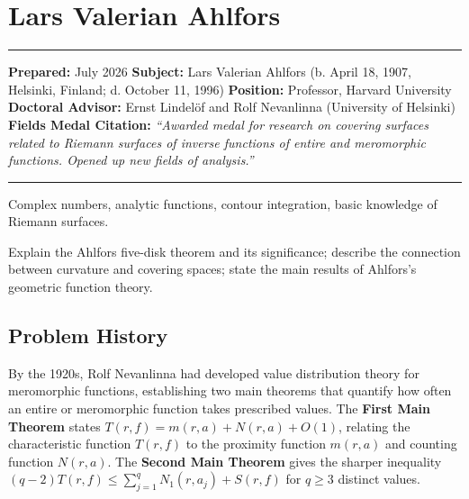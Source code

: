 \chapter{Lars Valerian Ahlfors}\label{ch1936larsvalerianahlfors:lars-valerian-ahlfors-fields-medal-1936-a-comprehensive-report}

\begin{center}\rule{0.5\linewidth}{0.5pt}\end{center}

\textbf{Prepared:} July 2026 \textbf{Subject:} Lars Valerian Ahlfors (b.
April 18, 1907, Helsinki, Finland; d. October 11, 1996) \textbf{Position:} Professor, Harvard
University \textbf{Doctoral Advisor:} Ernst Lindel\"{o}f and Rolf Nevanlinna
(University of Helsinki) \textbf{Fields Medal Citation:} \emph{``Awarded
medal for research on covering surfaces related to Riemann surfaces of
inverse functions of entire and meromorphic functions. Opened up new
fields of analysis.''}

\begin{center}\rule{0.5\linewidth}{0.5pt}\end{center}

\begin{prereqs} Complex numbers, analytic functions, contour integration, basic knowledge of Riemann surfaces. \end{prereqs}

\begin{objectives} Explain the Ahlfors five-disk theorem and its significance; describe the connection between curvature and covering spaces; state the main results of Ahlfors's geometric function theory. \end{objectives}

\section{Problem History}

By the 1920s, Rolf Nevanlinna \cite{ahlfors1936} had developed value distribution theory for meromorphic functions, establishing two main theorems that quantify how often an entire or meromorphic function takes prescribed values. The \textbf{First Main Theorem} states $T(r, f) = m(r, a) + N(r, a) + O(1)$, relating the characteristic function $T(r,f)$ to the proximity function $m(r,a)$ and counting function $N(r,a)$. The \textbf{Second Main Theorem} gives the sharper inequality $(q-2)T(r,f) \leq \sum_{j=1}^q N_1(r, a_j) + S(r,f)$ for $q \geq 3$ distinct values.

